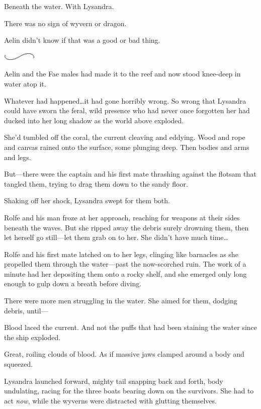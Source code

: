 Beneath the water.
With Lysandra.

There was no sign of wyvern or dragon.

Aelin didn't know if that was a good or bad thing.

\begin{center}
	\includegraphics[width=0.65in,height=0.13in]{images/seperator}
\end{center}

Aelin and the Fae males had made it to the reef and now stood knee-deep in water atop it.

Whatever had happened\ldots it had gone horribly wrong.
So wrong that Lysandra could have sworn the feral, wild presence who had never once forgotten her had ducked into her long shadow as the world above exploded.

She'd tumbled off the coral, the current cleaving and eddying.
Wood and rope and canvas rained onto the surface, some plunging deep.
Then bodies and arms and legs.

But---there were the captain and his first mate thrashing against the flotsam that tangled them, trying to drag them down to the sandy floor.

Shaking off her shock, Lysandra swept for them both.

Rolfe and his man froze at her approach, reaching for weapons at their sides beneath the waves.
But she ripped away the debris surely drowning them, then let herself go still---let them grab on to her.
She didn't have much time\ldots{}

Rolfe and his first mate latched on to her legs, clinging like barnacles as she propelled them through the water---past the now-scorched ruin.
The work of a minute had her depositing them onto a rocky shelf, and she emerged only long enough to gulp down a breath before diving.

There were more men struggling in the water.
She aimed for them, dodging debris, until---

Blood laced the current.
And not the puffs that had been staining the water since the ship exploded.

Great, roiling clouds of blood.
As if massive jaws clamped around a body and squeezed.

Lysandra launched forward, mighty tail snapping back and forth, body undulating, racing for the three boats bearing down on the survivors.
She had to act \emph{now}, while the wyverns were distracted with glutting themselves.

